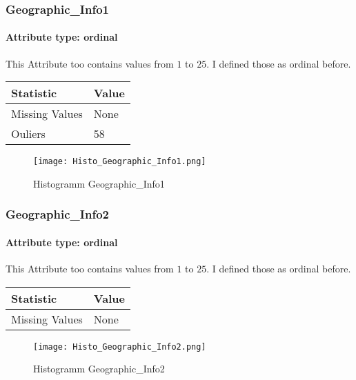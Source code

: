 \subsubsection{Geographic\_Info1}
\paragraph{Attribute type: ordinal} This Attribute too contains values from $1$ to $25$. I defined those as ordinal before.

\begin{table}[H]
	\renewcommand{\arraystretch}{1.25}
	\begin{tabular}{l|l}
		\textbf{Statistic} & \textbf{Value}\\\hline
		Missing Values& None\\\hline
		Ouliers & 58
	\end{tabular}
\end{table}

\begin{figure}[H]
	\begin{center}
		\texttt{[image: Histo\_Geographic\_Info1.png]}
	\end{center}
	\caption{Histogramm Geographic\_Info1}
\end{figure}

\subsubsection{Geographic\_Info2}
\paragraph{Attribute type: ordinal} This Attribute too contains values from $1$ to $25$. I defined those as ordinal before.

\begin{table}[H]
	\renewcommand{\arraystretch}{1.25}
	\begin{tabular}{l|l}
		\textbf{Statistic} & \textbf{Value}\\\hline
		Missing Values& None\\\hline		
	\end{tabular}
\end{table}

\begin{figure}[H]
	\begin{center}
		\texttt{[image: Histo\_Geographic\_Info2.png]}
	\end{center}
	\caption{Histogramm Geographic\_Info2}
\end{figure}

